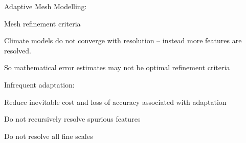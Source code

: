 \begin{slide}
{
    Adaptive Mesh Modelling:
}

\begin{center}\large

Mesh refinement criteria
\end{center}

\begin{list0}

\item Climate models do not converge with resolution -- instead more features are resolved.

\item So mathematical error estimates may not be optimal refinement criteria

\item Infrequent adaptation:

\begin{list1}

\item Reduce inevitable cost and loss of accuracy associated with adaptation

\item Do not recursively resolve spurious features

\item Do not resolve all fine scales

\end{list1}
\end{list0}

\end{slide}

\newcommand{\listMeshAdapt}[8]
{
\begin{list1}
    \item \textcolor{#1}{Map latest solution onto a uniform coarse mesh}
    \item \textcolor{#2}{Calculate a measure of the features which are unresolved on the coarse mesh and represent this on the coarse mesh}
    \item \textcolor{#3}{Simulate the next 12 hours on the coarse mesh advecting the unresolved features}
    \item \textcolor{#4}{Keep track of maximum refinement criteria on the coarse mesh over 12 hours based on resolved and unresolved features}
    \item \textcolor{#5}{Define a new required mesh density function based on coarse mesh refinement criteria over 12 hours}
    \item \textcolor{#6}{Generate a new mesh which satisfies the given mesh density function}
    \item \textcolor{#7}{Map previous latest refined mesh solution onto new mesh}
    \item \textcolor{#8}{Simulate 12 hours on the new refined mesh}
\end{list1}
}

